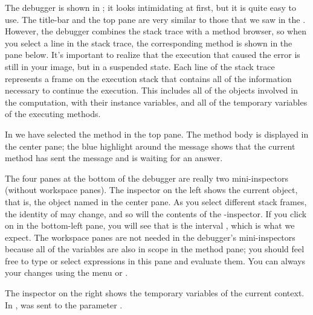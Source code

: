 \documentclass[a4paper,10pt,twoside]{book}
\begin{document}
The debugger is shown in ; it looks intimidating at first, but it is quite easy to use.
The title-bar and the top pane are very similar to those that we saw in the .  
However, the debugger combines the stack trace with a method browser, so when you select a line in the stack trace, the corresponding method is shown in the pane below.
It's important to realize that the execution that caused the error is still in your image, but in a suspended state.  
Each line of the stack trace represents a frame on the execution stack that contains all of the information necessary to continue the execution.  This includes all of the objects involved in the computation, with their instance variables, and all of the temporary variables of the executing methods.

In  we have selected the  method in the top pane.
The method body is displayed in the center pane; the blue highlight around the message  shows that the current method has sent the message  and is waiting for an answer.

The four panes at the bottom of the debugger are really two mini-inspectors (without workspace panes).
The inspector on the left shows the current object, that is, the object named \self in the center pane.
As you select different stack frames, the identity of \self may change, and so will the contents of the 
\self{}-inspector.
If you click on \self in the bottom-left pane, you will see that \self is the interval , which is what we expect.
The workspace panes are not needed in the debugger's mini-inspectors because all of the variables are also in scope in the method pane; you should feel free to type or select expressions in this pane and evaluate them.  
You can always  your changes using the menu or . 

The inspector on the right shows the temporary variables of the current context.
In ,
 was sent to the parameter .

\end{document}

